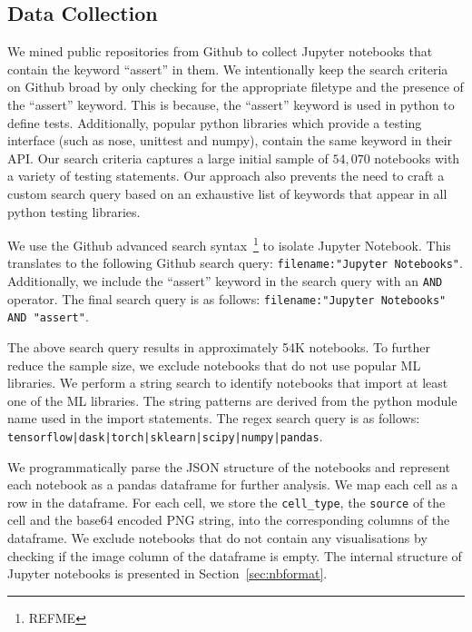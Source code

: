 \documentclass[acmsmall,screen,review,anonymous]{acmart}
\begin{document}
\subsection{Data Collection}\label{sec:data-collect}

We mined public repositories from Github to collect Jupyter notebooks that contain the keyword ``assert'' in them. We intentionally keep the search criteria on Github broad by only checking for the appropriate filetype and the presence of the ``assert'' keyword. This is because, the ``assert'' keyword is used in python to define tests. Additionally, popular python libraries which provide a testing interface (such as nose, unittest and numpy), contain the same keyword in their API. Our search criteria captures a large initial sample of $54,070$ notebooks with a variety of testing statements. Our approach also prevents the need to craft a custom search query based on an exhaustive list of keywords that appear in all python testing libraries.

We use the Github advanced search syntax~\footnote{REFME} to isolate Jupyter Notebook. This translates to the following Github search query: \texttt{filename:"Jupyter Notebooks"}. Additionally, we include the ``assert'' keyword in the search query with an \texttt{AND} operator. The final search query is as follows: \texttt{filename:"Jupyter Notebooks" AND "assert"}.

The above search query results in approximately 54K notebooks. To further reduce the sample size, we exclude notebooks that do not use popular ML libraries. We perform a string search to identify notebooks that import at least one of the ML libraries. The string patterns are derived from the python module name used in the import statements. The regex search query is as follows: \texttt{tensorflow|dask|torch|sklearn|scipy|numpy|pandas}.

We programmatically parse the JSON structure of the notebooks and represent each notebook as a pandas dataframe for further analysis. We map each cell as a row in the dataframe. For each cell, we store the \texttt{cell\_type}, the \texttt{source} of the cell and the base64 encoded PNG string, into the corresponding columns of the dataframe. We exclude notebooks that do not contain any visualisations by checking if the image column of the dataframe is empty. The internal structure of Jupyter notebooks is presented in Section~\ref{sec:nbformat}.
\end{document}
